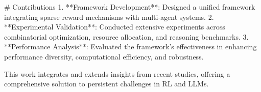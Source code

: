 # Contributions  
1. **Framework Development**: Designed a unified framework integrating sparse reward mechanisms with multi-agent systems.  
2. **Experimental Validation**: Conducted extensive experiments across combinatorial optimization, resource allocation, and reasoning benchmarks.  
3. **Performance Analysis**: Evaluated the framework's effectiveness in enhancing performance diversity, computational efficiency, and robustness.  

This work integrates and extends insights from recent studies, offering a comprehensive solution to persistent challenges in RL and LLMs.